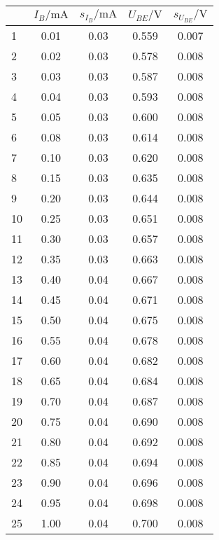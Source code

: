 \begin{center}
    \begin{tabular}{l|cccc}
        {} &     $I_B/\text{mA}$ &   $s_{I_B}/\text{mA}$ &     $U_{BE}/\text{V}$ &   $s_{U_{BE}}/\text{V}$ \\
        \hline
        1  &  0.01 &     0.03 &  0.559 &     0.007 \\
        2  &  0.02 &     0.03 &  0.578 &     0.008 \\
        3  &  0.03 &     0.03 &  0.587 &     0.008 \\
        4  &  0.04 &     0.03 &  0.593 &     0.008 \\
        5  &  0.05 &     0.03 &  0.600 &     0.008 \\
        6  &  0.08 &     0.03 &  0.614 &     0.008 \\
        7  &  0.10 &     0.03 &  0.620 &     0.008 \\
        8  &  0.15 &     0.03 &  0.635 &     0.008 \\
        9  &  0.20 &     0.03 &  0.644 &     0.008 \\
        10 &  0.25 &     0.03 &  0.651 &     0.008 \\
        11 &  0.30 &     0.03 &  0.657 &     0.008 \\
        12 &  0.35 &     0.03 &  0.663 &     0.008 \\
        13 &  0.40 &     0.04 &  0.667 &     0.008 \\
        14 &  0.45 &     0.04 &  0.671 &     0.008 \\
        15 &  0.50 &     0.04 &  0.675 &     0.008 \\
        16 &  0.55 &     0.04 &  0.678 &     0.008 \\
        17 &  0.60 &     0.04 &  0.682 &     0.008 \\
        18 &  0.65 &     0.04 &  0.684 &     0.008 \\
        19 &  0.70 &     0.04 &  0.687 &     0.008 \\
        20 &  0.75 &     0.04 &  0.690 &     0.008 \\
        21 &  0.80 &     0.04 &  0.692 &     0.008 \\
        22 &  0.85 &     0.04 &  0.694 &     0.008 \\
        23 &  0.90 &     0.04 &  0.696 &     0.008 \\
        24 &  0.95 &     0.04 &  0.698 &     0.008 \\
        25 &  1.00 &     0.04 &  0.700 &     0.008 \\

\end{tabular}
\end{center}
